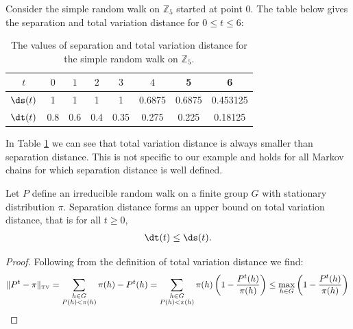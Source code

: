 \documentclass[11pt]{report}
\begin{document}
\begin{example}
	\label{chpt2:ex:tvsep}
	Consider the simple random walk on $\mathbb{Z}_{5}$ started at point $0$. 
	The table below gives the separation and total variation distance for 
	$0\leq t \leq 6$:
	\begin{table}[H]
		\begin{tabular}{c|c|c|c|c|c|c|c}
			$t$ & $0$ & $1$ & $2$ & $3$ & $4$ & 5 & 6\\ \hline
			$\ds(t)$ & 1 & 1 & 1 & 1 & 
			0.6875 & 0.6875 & 0.453125\\ \hline
			$\dt(t)$ & 0.8 & 0.6 
			& 0.4 & 0.35 & 0.275 & 0.225 & 0.18125
		\end{tabular}
		\caption[The values of separation and total variation distance for the simple random walk on $\mathbb{Z}_{5}$]{The values of separation and total variation distance for the simple random walk on $\mathbb{Z}_{5}$.}
		\label{chpt2:table:tvsep}
	\end{table} 
\end{example}

In Table \ref{chpt2:table:tvsep} we can see that total variation distance is 
always smaller than separation distance. This is not specific to our example 
and holds for all Markov chains for which separation distance is well defined. 


\begin{lemma}
	\label{chpt2:lem:sepupperbound}
	Let $P$ define an irreducible random walk on a finite group $G$ with stationary 
	distribution $\pi$. Separation distance forms an upper bound on total 
	variation distance, that is for all $t\geq 0$,
	\begin{eqnarray}
	\dt(t) \leq \ds(t) .
	\end{eqnarray}
\end{lemma}

\begin{proof}
	Following from the definition of total variation distance we find:
	\begin{eqnarray*}
		\lVert P^{t} -\pi \rVert_{\textnormal{\tiny TV}}	= \sum_{\substack{h 
				\in G \\ P(h) < \pi(h)}} 
		\pi(h) - P^{t}(h)  = \sum_{\substack{h \in G \\ 
				P(h) < \pi(h)}} \pi(h)
		\left(1 - \frac{ P^{t}(h)}{\pi(h)} \right) \leq \max_{h \in  
			G} \left(1	-\frac{ P^{t}(h)}{\pi(h)} \right) \qedhere
	\end{eqnarray*}
\end{proof}
\end{document}
